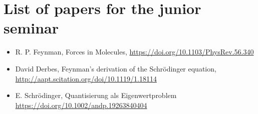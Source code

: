 \documentclass[A4paper, 12pt]{article}
\begin{document}
\section*{List of papers for the junior seminar}

\begin{itemize}
  \item
    R. P. Feynman, Forces in Molecules,
    \url{https://doi.org/10.1103/PhysRev.56.340}
  \item
    David Derbes, Feynman’s derivation of the Schrödinger equation,
    \url{http://aapt.scitation.org/doi/10.1119/1.18114}
  \item
    E. Schrödinger, Quantisierung als Eigenwertproblem
    \url{https://doi.org/10.1002/andp.19263840404}

\end{itemize}
\end{document}
